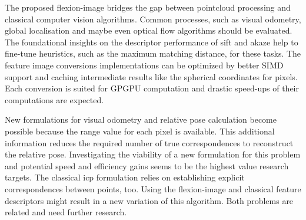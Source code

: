 The proposed \gls{flexion-image} bridges the gap between pointcloud processing and classical computer vision algorithms.
Common processes, such as visual odometry, global localisation and maybe even optical flow algorithms should be evaluated.
The foundational insights on the descriptor performance of \acrshort{sift} and \acrshort{akaze} help to fine-tune heuristics, such as the maximum matching distance, for these tasks.
The feature image conversions implementations can be optimized by better \acrshort{SIMD} support and caching intermediate results like the spherical coordinates for pixels.
Each conversion is suited for \acrshort{GPGPU} computation and drastic speed-ups of their computations are expected.

New formulations for visual odometry and relative pose calculation become possible because the range value for each pixel is available.
This additional information reduces the required number of true correspondences to reconstruct the relative pose.
Investigating the viability of a new formulation for this problem and potential speed and efficiency gains seems to be the highest value research targets.
The classical \acrshort{icp} formulation relies on establishing explicit correspondences between points, too.
Using the \gls{flexion-image} and classical feature descriptors might result in a new variation of this algorithm.
Both problems are related and need further research.
